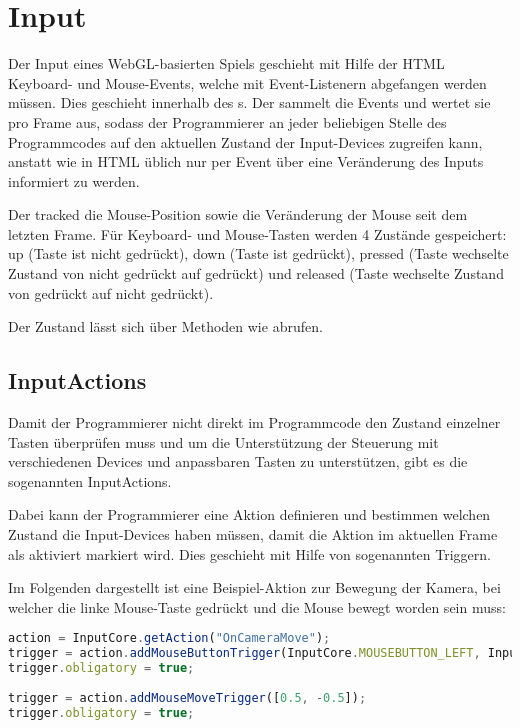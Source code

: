 \chapter{Input}

Der Input eines WebGL-basierten Spiels geschieht mit Hilfe der HTML Keyboard- und Mouse-Events, welche mit Event-Listenern abgefangen werden müssen. Dies geschieht innerhalb des s. Der  sammelt die Events und wertet sie pro Frame aus, sodass der Programmierer an jeder beliebigen Stelle des Programmcodes auf den aktuellen Zustand der Input-Devices zugreifen kann, anstatt wie in HTML üblich nur per Event über eine Veränderung des Inputs informiert zu werden.

Der  tracked die Mouse-Position sowie die Veränderung der Mouse seit dem letzten Frame. Für Keyboard- und Mouse-Tasten werden 4 Zustände gespeichert: up (Taste ist nicht gedrückt), down (Taste ist gedrückt), pressed (Taste wechselte Zustand von nicht gedrückt auf gedrückt) und released (Taste wechselte Zustand von gedrückt auf nicht gedrückt).

Der Zustand lässt sich über Methoden wie  abrufen.

\section{InputActions}

Damit der Programmierer nicht direkt im Programmcode den Zustand einzelner Tasten überprüfen muss und um die Unterstützung der Steuerung mit verschiedenen Devices und anpassbaren Tasten zu unterstützen, gibt es die sogenannten InputActions.

Dabei kann der Programmierer eine Aktion definieren und bestimmen welchen Zustand die Input-Devices haben müssen, damit die Aktion im aktuellen Frame als aktiviert markiert wird. Dies geschieht mit Hilfe von sogenannten Triggern.

Im Folgenden dargestellt ist eine Beispiel-Aktion zur Bewegung der Kamera, bei welcher die linke Mouse-Taste gedrückt und die Mouse bewegt worden sein muss:

\begin{lstlisting}[language=JavaScript]
action = InputCore.getAction("OnCameraMove");
trigger = action.addMouseButtonTrigger(InputCore.MOUSEBUTTON_LEFT, InputCore.MOUSEBUTTON_STATE_DOWN);
trigger.obligatory = true;
			
trigger = action.addMouseMoveTrigger([0.5, -0.5]);
trigger.obligatory = true;
\end{lstlisting}

